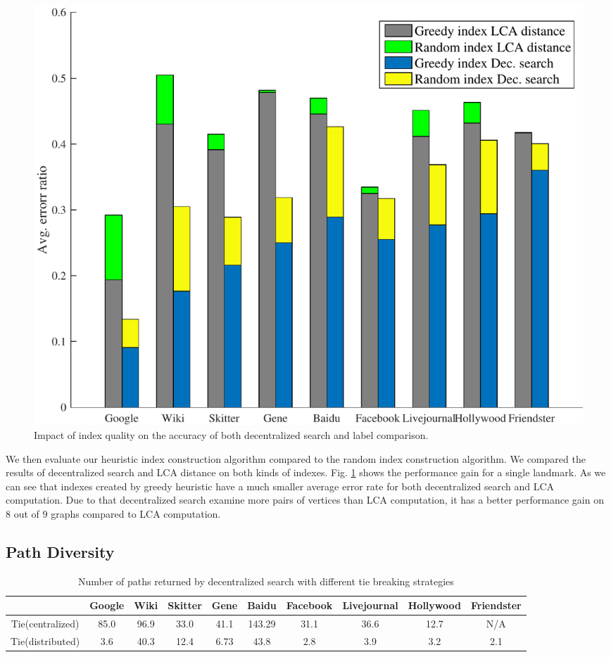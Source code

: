 \begin{figure}[t]
    \centering
    \includegraphics[width=\linewidth]{./figures/accuracy_index.pdf}
    \caption{Impact of index quality on the accuracy of both decentralized search and label comparison.}
    \label{fig:accuracy_index}
\end{figure}

We then evaluate our heuristic index construction algorithm compared to the random index construction algorithm. We compared the results of decentralized search and LCA distance on both kinds of indexes. Fig. \ref{fig:accuracy_index} shows the performance gain for a single landmark. As we can see that indexes created by greedy heuristic have a much smaller average error rate for both decentralized search and LCA computation. Due to that decentralized search examine more pairs of vertices than LCA computation, it has a better performance gain on $8$ out of $9$ graphs compared to LCA computation.

\subsection{Path Diversity}
\label{eval_diversity}

\begin{table} [ht]
    \centering
    \begin{tabular}{cccccccccc} \hline
				&Google&Wiki&Skitter&Gene&Baidu&Facebook&Livejournal&Hollywood&Friendster \\ \hline
				Tie(centralized)&85.0&96.9&33.0&41.1&143.29&31.1&36.6&12.7&N/A \\ \hline
				Tie(distributed)&3.6&40.3&12.4&6.73&43.8&2.8&3.9&3.2&2.1 \\ \hline
    \end{tabular}
    \caption{Number of paths returned by decentralized search with different tie breaking strategies}
    \label{table:NOP}
\end{table}

